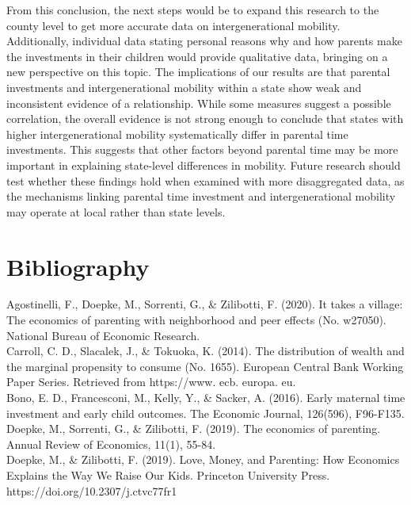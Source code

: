 \documentclass[12pt]{article}
\begin{document}
From this conclusion, the next steps would be to expand this research to the county level to get more accurate data on intergenerational mobility. Additionally, individual data stating personal reasons why and how parents make the investments in their children would provide qualitative data, bringing on a new perspective on this topic. The implications of our results are that parental investments and intergenerational mobility within a state show weak and inconsistent evidence of a relationship. While some measures suggest a possible correlation, the overall evidence is not strong enough to conclude that states with higher intergenerational mobility systematically differ in parental time investments. This suggests that other factors beyond parental time may be more important in explaining state-level differences in mobility. Future research should test whether these findings hold when examined with more disaggregated data, as the mechanisms linking parental time investment and intergenerational mobility may operate at local rather than state levels. 

\newpage
\section*{Bibliography}
\singlespacing
\setlength\bibsep{0pt}
\setlength{\parindent}{0pt}
\setlength{\parskip}{0pt}

Agostinelli, F., Doepke, M., Sorrenti, G., \& Zilibotti, F. (2020). It takes a village: The economics of parenting with neighborhood and peer effects (No. w27050). National Bureau of Economic Research.\\
    
Carroll, C. D., Slacalek, J., \& Tokuoka, K. (2014). The distribution of wealth and the marginal propensity to consume (No. 1655). European Central Bank Working Paper Series. Retrieved from https://www. ecb. europa. eu.\\

Bono, E. D., Francesconi, M., Kelly, Y., \& Sacker, A. (2016). Early maternal time investment and early child outcomes. The Economic Journal, 126(596), F96-F135.\\

Doepke, M., Sorrenti, G., \& Zilibotti, F. (2019). The economics of parenting. Annual Review of Economics, 11(1), 55-84.\\

Doepke, M., \& Zilibotti, F. (2019). Love, Money, and Parenting: How Economics Explains the Way We Raise Our Kids. Princeton University Press. https://doi.org/10.2307/j.ctvc77fr1\\
\end{document}
